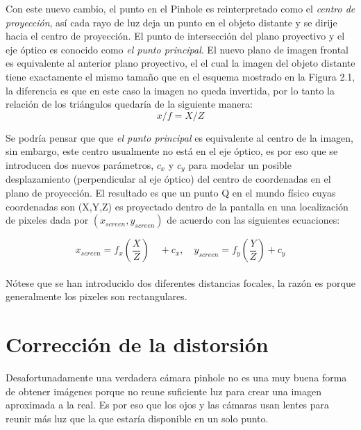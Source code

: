 \documentclass{book}
\begin{document}
Con este nuevo cambio, el punto en el Pinhole es reinterpretado como el \textit{centro de proyección}, así cada rayo de luz deja un punto en el objeto distante y se dirije hacia el centro de proyección. El punto de intersección del plano proyectivo y el eje óptico es conocido como \textit{el punto principal}. El nuevo plano de imagen frontal es equivalente al anterior plano proyectivo, el el cual la imagen del objeto distante tiene exactamente el mismo tamaño que en el esquema mostrado en la Figura 2.1, la diferencia es que en este caso la imagen no queda invertida, por lo tanto la relación de los triángulos quedaría de la siguiente manera: 
\[x/f = X/Z\]

Se podría pensar que que \textit{el punto principal} es equivalente al centro de la imagen, sin embargo, este centro usualmente no está en el eje óptico, es por eso que se introducen dos nuevos parámetros, $c_{x}$ y $c_{y}$ para modelar un posible desplazamiento (perpendicular al eje óptico) del centro de coordenadas en el plano de proyección. El resultado es que un punto Q en el mundo físico cuyas coordenadas son  (X,Y,Z) es proyectado dentro de la pantalla en una localización de pixeles dada por $(x_{screen},y_{screen})$ de acuerdo con las siguientes ecuaciones:

\[x_{screen}=f_{x}(\frac{X}{Z}) \quad + c_{x},\quad y_{screen}=f_{y}(\frac{Y}{Z}) + c_{y}\]	\\


Nótese que se han introducido dos diferentes distancias focales, la razón es porque generalmente los pixeles son rectangulares.
		
\section{Corrección de la distorsión}
Desafortunadamente una verdadera cámara pinhole no es una muy buena forma de obtener imágenes porque no reune suficiente luz para crear una imagen aproximada a la real. Es por eso que los ojos y las cámaras usan lentes para reunir más luz que la que estaría disponible en un solo punto.
\end{document}
